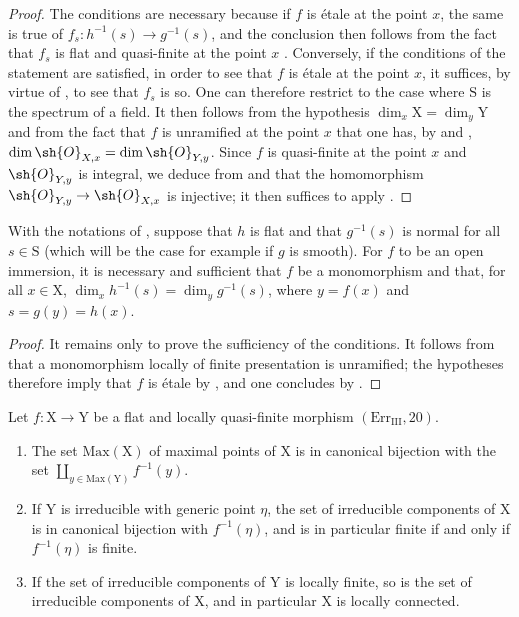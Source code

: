 \begin{proof}
The conditions are necessary because if $f$ is \'etale at the point $x$, the same is true of $f_s:h^{-1}(s)\to g^{-1}(s)$, and the conclusion then follows from the fact that $f_s$ is flat and quasi-finite at the point $x$ .
Conversely, if the conditions of the statement are satisfied, in order to see that $f$ is \'etale at the point $x$, it suffices, by virtue of , to see that $f_s$ is so.
One can therefore restrict to the case where $\mathrm{S}$ is the spectrum of a field.
It then follows from the hypothesis $\dim_x\mathrm{X}=\dim_y\mathrm{Y}$ and from the fact that $f$ is unramified at the point $x$ that one has, by  and , $\dim\sh{O}_{X,x}=\dim\sh{O}_{Y,y}$. Since $f$ is quasi-finite at the point $x$ and $\sh{O}_{Y,y}$ is integral, we deduce from  and  that the homomorphism $\sh{O}_{Y,y}\to\sh{O}_{X,x}$ is injective; it then suffices to apply .
\end{proof}

\begin{corollary}[18.10.5]
\label{IV.18.10.5}
With the notations of , suppose that $h$ is flat and that $g^{-1}(s)$ is normal for all $s\in\mathrm{S}$ (which will be the case for example if $g$ is smooth).
For $f$ to be an open immersion, it is necessary and sufficient that $f$ be a monomorphism and that, for all $x\in\mathrm{X}$, $\dim_xh^{-1}(s)=\dim_yg^{-1}(s)$, where $y=f(x)$ and $s=g(y)=h(x)$.
\end{corollary}

\begin{proof}
It remains only to prove the sufficiency of the conditions. It follows from  that a monomorphism locally of finite presentation is unramified; the hypotheses therefore imply that $f$ is \'etale by , and one concludes by .
\end{proof}

\begin{lemma}[18.10.6]
\label{IV.18.10.6}
Let $f:\mathrm{X}\to\mathrm{Y}$ be a flat and locally quasi-finite morphism $(\mathrm{Err}_{\mathrm{III}}, 20)$.
\begin{enumerate}[label=(\roman*)]
  \item The set $\mathrm{Max}(\mathrm{X})$ of maximal points of $\mathrm{X}$ is in canonical bijection with the set $\coprod_{y\in\mathrm{Max}(\mathrm{Y})}f^{-1}(y)$.
  \item If $\mathrm{Y}$ is irreducible with generic point $\eta$, the set of irreducible components of $\mathrm{X}$ is in canonical bijection with $f^{-1}(\eta)$, and is in particular finite if and only if $f^{-1}(\eta)$ is finite.
  \item If the set of irreducible components of $\mathrm{Y}$ is locally finite, so is the set of irreducible components of $\mathrm{X}$, and in particular $\mathrm{X}$ is locally connected.
\end{enumerate}
\end{lemma}

